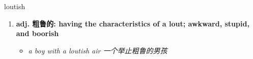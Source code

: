 
\begin{frame}
{\huge loutish}
\begin{center}
\begin{enumerate}\Large
  \item \textbf{adj. 粗鲁的: having the characteristics of a lout; awkward, stupid, and boorish}
  \begin{itemize}
    \item \em{\Large{a boy with a loutish air 一个举止粗鲁的男孩}}
  \end{itemize}
\end{enumerate}
\end{center}
\end{frame}
